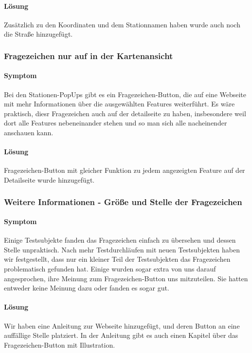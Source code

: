       \paragraph{Lösung}
      Zusätzlich zu den Koordinaten und dem Stationnamen haben wurde auch noch die Straße hinzugefügt.

    \subsubsection*{Fragezeichen nur auf in der Kartenansicht}
      \paragraph{Symptom}
      Bei den Stationen-PopUps gibt es ein Fragezeichen-Button, die auf eine Webseite mit mehr Informationen über die ausgewählten Features weiterführt. Es wäre praktisch, diesr Fragezeichen auch auf der detailseite zu haben, insbesondere weil dort alle Features nebeneinander stehen und so man sich alle nacheinender anschauen kann.

      \paragraph{Lösung}
      Fragezeichen-Button mit gleicher Funktion zu jedem angezeigten Feature auf der Detailseite wurde hinzugefügt.

    \subsubsection*{Weitere Informationen - Größe und Stelle der Fragezeichen}

      \paragraph{Symptom}
      Einige Testsubjekte fanden das Fragezeichen einfach zu übersehen und dessen Stelle unpraktisch. Nach mehr Testdurchläufen mit neuen Testsubjekten haben wir festgestellt, dass nur ein kleiner Teil der Testsubjekten das Fragezeichen problematisch gefunden hat. Einige wurden sogar extra von uns darauf angesprochen, ihre Meinung zum Fragezeichen-Button uns mitzuteilen. Sie hatten entweder keine Meinung dazu oder fanden es sogar gut.

      \paragraph{Lösung}
      Wir haben eine Anleitung zur Webseite hinzugefügt, und deren Button an eine auffällige Stelle platziert. In der Anleitung gibt es auch einen Kapitel über das Fragezeichen-Button mit Illustration. 


